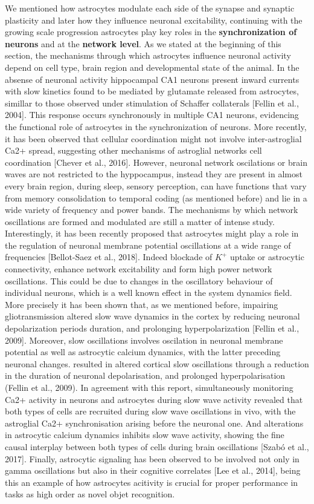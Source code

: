 We mentioned how astrocytes modulate each side of the synapse and synaptic plasticity and later how they influence neuronal excitability, continuing with the growing scale progression astrocytes play key roles in the \textbf{synchronization of neurons} and at the \textbf{network level}.
As we stated at the beginning of this section, the mechanisms through which astrocytes influence neuronal activity depend on cell type, brain region and developmental state of the animal.
In the absense of neuronal activity hippocampal CA1 neurons present inward currents with slow kinetics found to be mediated by glutamate released from astrocytes, simillar to those observed under stimulation of Schaffer collaterals [Fellin et al., 2004].
This response occurs synchronously in multiple CA1 neurons, evidencing the functional role of astrocytes in the synchronization of neurons.
More recently, it has been observed that cellular coordination might not involve inter-astroglial Ca2+ spread, suggesting other mechanisms of astroglial networks cell coordination [Chever et al., 2016]. 
However, neuronal network oscilations or brain waves are not restricted to the hyppocampus, instead they are present in almost every brain region, during sleep, sensory perception, can have functions that vary from memory consolidation to temporal coding (as mentioned before) and lie in a wide variety of frequency and power bands.   
The mechanisms by which network oscillations are formed and modulated are still a matter of intense study.
Interestingly, it has been recently proposed that astrocytes might play a role in the regulation of neuronal membrane potential oscillations at a wide range of frequencies [Bellot-Saez et al., 2018].
Indeed blockade of $K^+$ uptake or astrocytic connectivity, enhance network excitability and form high power network oscillations.
This could be due to changes in the oscillatory behaviour of individual neurons, which is a well known effect in the system dynamics field.
More precisely it has been shown that, as we mentioned before, impairing gliotransmission altered slow wave dynamics in the cortex by reducing neuronal depolarization periods duration, and prolonging hyperpolarization [Fellin et al., 2009].
Moreover, slow oscillations involves oscilation in neuronal membrane potential as well as astrocytic calcium dynamics, with the latter preceding neuronal changes.   
resulted in altered cortical slow oscillations through a reduction in the duration of neuronal depolarisation, and prolonged hyperpolarisation (Fellin et al., 2009). In agreement with this report, simultaneously monitoring Ca2+ activity in neurons and astrocytes during slow wave activity revealed that both types of cells are recruited during slow wave oscillations in vivo, with the astroglial Ca2+ synchronisation arising before the neuronal one. 
And alterations in astrocytic calcium dynamics inhibits slow wave activity, showing the fine causal interplay between both types of cells during brain oscillations [Szabó et al., 2017].
Finally, astrocytic signaling has been observed to be involved not only in gamma oscillations but also in their cognitive correlates [Lee et al., 2014], being this an example of how astrocytes acitivity is crucial for proper performance in tasks as high order as novel objet recognition.

